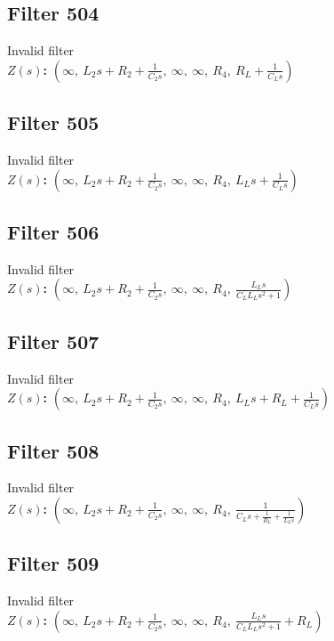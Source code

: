 \documentclass{article}
\begin{document}
\subsection*{Filter 504}
Invalid filter \\ 
\textbf{$Z(s)$:} $\left( \infty, \  L_{2} s + R_{2} + \frac{1}{C_{2} s}, \  \infty, \  \infty, \  R_{4}, \  R_{L} + \frac{1}{C_{L} s}\right)$ \\ 
\subsection*{Filter 505}
Invalid filter \\ 
\textbf{$Z(s)$:} $\left( \infty, \  L_{2} s + R_{2} + \frac{1}{C_{2} s}, \  \infty, \  \infty, \  R_{4}, \  L_{L} s + \frac{1}{C_{L} s}\right)$ \\ 
\subsection*{Filter 506}
Invalid filter \\ 
\textbf{$Z(s)$:} $\left( \infty, \  L_{2} s + R_{2} + \frac{1}{C_{2} s}, \  \infty, \  \infty, \  R_{4}, \  \frac{L_{L} s}{C_{L} L_{L} s^{2} + 1}\right)$ \\ 
\subsection*{Filter 507}
Invalid filter \\ 
\textbf{$Z(s)$:} $\left( \infty, \  L_{2} s + R_{2} + \frac{1}{C_{2} s}, \  \infty, \  \infty, \  R_{4}, \  L_{L} s + R_{L} + \frac{1}{C_{L} s}\right)$ \\ 
\subsection*{Filter 508}
Invalid filter \\ 
\textbf{$Z(s)$:} $\left( \infty, \  L_{2} s + R_{2} + \frac{1}{C_{2} s}, \  \infty, \  \infty, \  R_{4}, \  \frac{1}{C_{L} s + \frac{1}{R_{L}} + \frac{1}{L_{L} s}}\right)$ \\ 
\subsection*{Filter 509}
Invalid filter \\ 
\textbf{$Z(s)$:} $\left( \infty, \  L_{2} s + R_{2} + \frac{1}{C_{2} s}, \  \infty, \  \infty, \  R_{4}, \  \frac{L_{L} s}{C_{L} L_{L} s^{2} + 1} + R_{L}\right)$ \\ 
\end{document}
